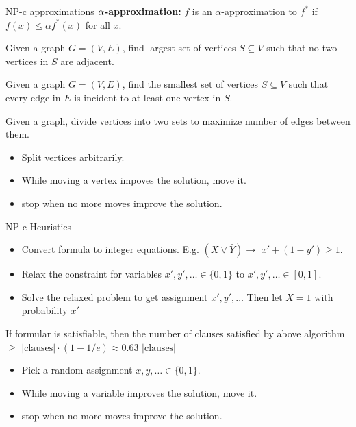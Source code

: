 \documentclass[10pt,a4paper]{article}
\begin{document}
\begin{multicols}{3}
\begin{textbox}{NP-c approximations}
    {\bf ${\bf \alpha}$-approximation:} $f$ is an $\alpha$-approximation to 
    $f^*$ if $f(x) \leq \alpha f^*(x)$ for all $x$.

     Given a graph $G = (V, E)$, find largest set of 
    vertices $S \subseteq V$ such that no two vertices in $S$ are adjacent.

     Given a graph $G = (V, E)$, find the smallest set of 
    vertices $S \subseteq V$ such that every edge in $E$ is incident to at 
    least one vertex in $S$.

     Given a graph, divide vertices into two sets to maximize 
    number of edges between them.
    \begin{itemize}
        \item Split vertices arbitrarily. 
        \item While moving a vertex impoves the solution, move it.
        \item stop when no more moves improve the solution.
    \end{itemize}

\end{textbox}

\begin{textbox}{NP-c Heuristics}
    \begin{itemize}
        \item Convert formula to integer equations. E.g. $(X \vee 
        \bar{Y}) \to$ $x' + (1 - y') \geq 1$.
        \item Relax the constraint for variables $x', y', \dots \in \{0, 1\}$ to 
             $x', y', \dots \in [0, 1]$. 
        \item Solve the relaxed problem to get assignment $x', y', \dots$ 
                Then let $X = 1$ with probability $x'$
    \end{itemize}
     If formular is satisfiable, then the number of clauses satisfied 
    by above algorithm $\geq \text{ |clauses|} \cdot (1 - 1/e) \approx 0.63\text{ |clauses|}$

    \begin{itemize}
        \item Pick a random assignment $x, y, \dots \in \{0, 1\}$.
        \item While moving a variable improves the solution, move it.
        \item stop when no more moves improve the solution.
    \end{itemize}
\end{textbox}


\end{multicols}
\end{document}

